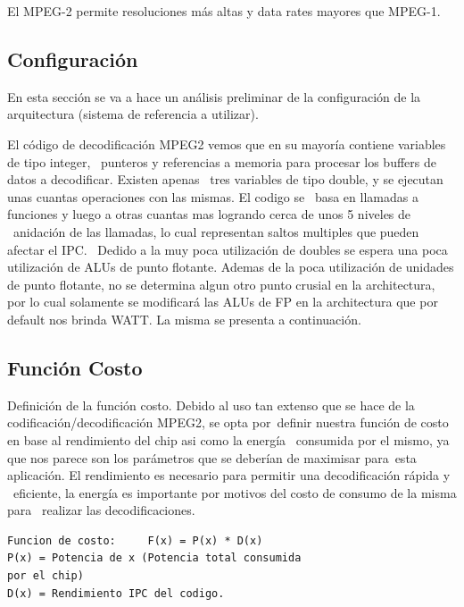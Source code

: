 \documentclass[journal]{IEEEtran}
\begin{document}
El MPEG-2 permite resoluciones m\'as altas y data rates mayores que MPEG-1.

\subsection{Configuraci\'{o}n}
En esta secci\'{o}n se va a hace un an\'{a}lisis preliminar de la configuraci\'{o}n de la arquitectura (sistema de referencia a utilizar).

El c\'odigo de decodificaci\'on MPEG2 vemos que en su mayor\'ia contiene variables de tipo integer, \
punteros y referencias a memoria para procesar los buffers de datos a decodificar. Existen apenas \
tres variables de tipo double, y se ejecutan unas cuantas operaciones con las mismas.  El codigo se \
basa en llamadas a funciones y luego a otras cuantas mas logrando cerca de unos 5 niveles de \
anidaci\'on de las llamadas, lo cual representan saltos multiples que pueden afectar el IPC. \
Dedido a la muy poca utilizaci\'on de doubles se espera una poca utilizaci\'on de ALUs de punto flotante. \newline 
Ademas de la poca utilizaci\'on de unidades de punto flotante, no se determina algun otro punto crusial en la architectura, por lo cual solamente se modificar\'a las ALUs de FP en la architectura que por default nos brinda WATT.  La misma se presenta a continuaci\'on.

\subsection{Funci\'{o}n Costo}
Definici\'{o}n de la funci\'{o}n costo.
Debido al uso tan extenso que se hace de la codificaci\'{o}n/decodificaci\'{o}n MPEG2, se opta por\
definir nuestra funci\'{o}n de costo en base al rendimiento del chip asi como la energ\'{i}a \
consumida por el mismo, ya que nos parece son los par\'{a}metros que se deber\'{i}an de maximisar para\
esta aplicaci\'{o}n.  El rendimiento es necesario para permitir una decodificaci\'{o}n r\'{a}pida y \
eficiente, la energ\'{i}a es importante por motivos del costo de consumo de la misma para \
realizar las decodificaciones.

\footnotesize \begin{verbatim}
Funcion de costo:     F(x) = P(x) * D(x)
P(x) = Potencia de x (Potencia total consumida 
por el chip)
D(x) = Rendimiento IPC del codigo.
\end{verbatim}
\normalsize
\end{document}
